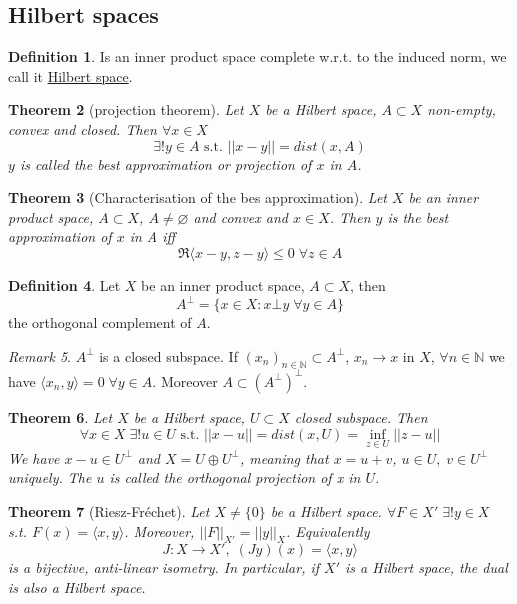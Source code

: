 \documentclass[a4paper, 12pt]{article}
\theoremstyle{plain}
\newtheorem{theorem}{Theorem}[subsection] %
\theoremstyle{definition}
\newtheorem{definition}[theorem]{Definition} %
\theoremstyle{lemma}
\theoremstyle{remark}
\newtheorem{remark}[theorem]{Remark}
\theoremstyle{corollary}
\theoremstyle{example}
\begin{document}
	\subsection{Hilbert spaces}
	\begin{definition}
		Is an inner product space complete w.r.t. to the induced norm, we call it \underline{Hilbert space}. 
	\end{definition}
	\begin{theorem}[projection theorem]
		Let $X$ be a Hilbert space, $A \subset X$ non-empty, convex and closed. Then $\forall x \in X$ \[\exists ! y \in A \text{ s.t. } ||x-y|| = dist(x,A)\]
		$y$ is called the best approximation or projection of $x$ in $A$.
	\end{theorem}
	\begin{theorem}[Characterisation of the bes approximation]
		Let $X$ be an inner product space, $A\subset X$, $A\neq \varnothing$ and convex and $x\in X$. Then $y$ is the best approximation of $x$ in A iff \[\Re \langle x-y, z-y \rangle \leq 0\; \forall z \in A\]
	\end{theorem}
	\begin{definition}
		Let $X$ be an inner product space, $A\subset X$, then \[A^\bot = \{x\in X: x\bot y \; \forall y \in A\}\] the orthogonal complement of $A$.
	\end{definition}
	\begin{remark}
		$A^\bot$ is a closed subspace. If $(x_n)_{n \in \mathbb{N}} \subset A^\bot$, $x_n \to x$ in $X$, $\forall n \in \mathbb{N}$ we have $\langle x_n,y\rangle = 0 \; \forall y \in A$. Moreover $A\subset (A^\bot)^\bot$.
	\end{remark}
	\begin{theorem}
		Let $X$ be a Hilbert space, $U\subset X$ closed subspace. Then \[\forall x \in X \; \exists ! u \in U \text{ s.t. } ||x-u|| = dist(x,U) = \inf_{z\in U} ||z-u||\]
		We have $x-u \in U^\bot$ and $X = U \oplus U^\bot$, meaning that $x = u+v$, $u\in U, \; v \in U^\bot$ uniquely. The $u$ is called the orthogonal projection of x in $U$.
	\end{theorem}
	\begin{theorem}[Riesz-Fréchet]
		Let $X \neq \{0\}$ be a Hilbert space. $\forall F \in X' \; \exists ! y \in X$ s.t. $F(x) = \langle x,y\rangle$. Moreover, $||F||_{X'} = ||y||_X$. Equivalently \[J: X \to X', \; (Jy)(x) = \langle x,y\rangle\] is a bijective, anti-linear isometry. In particular, if $X'$ is a Hilbert space, the dual is also a Hilbert space.
	\end{theorem}
\end{document}
